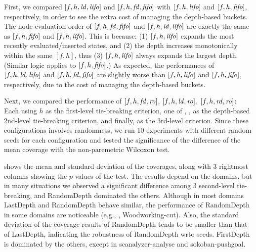 First, we compared $[f,h,\mbox{\textit{ld}},\mbox{\textit{lifo}}]$ and $[f,h,\mbox{\textit{fd}},\mbox{\textit{fifo}}]$
with $[f,h,\mbox{\textit{lifo}}]$ and $[f,h,\mbox{\textit{fifo}}]$, respectively, in order to see
the extra cost of managing the depth-based buckets.
The node evaluation order of $[f,h,\mbox{\textit{fd}},\mbox{\textit{fifo}}]$ and $[f,h,\mbox{\textit{ld}},\mbox{\textit{lifo}}]$
are exactly the same as $[f,h,\mbox{\textit{fifo}}]$ and $[f,h,\mbox{\textit{lifo}}]$.
This is because:
(1) $[f,h,\mbox{\textit{lifo}}]$ expands the most recently evaluated/inserted
states, and (2) the depth increases monotonically within the same $[f,h]$,
thus (3) $[f,h,\mbox{\textit{lifo}}]$ always expands the largest depth. (Similar logic
applies to $[f,h,\mbox{\textit{fifo}}]$.)
% 
As expected, the performances of $[f,h,\mbox{\textit{ld}},\mbox{\textit{lifo}}]$ and
$[f,h,\mbox{\textit{fd}},\mbox{\textit{fifo}}]$ are slightly worse than $[f,h,\mbox{\textit{lifo}}]$ and
$[f,h,\mbox{\textit{fifo}}]$, respectively, due to the cost of managing the depth-based buckets.

Next, we compared the performance of
$[f,h,\mbox{\textit{fd}},\mbox{\textit{ro}}]$, $[f,h,\mbox{\textit{ld}},\mbox{\textit{ro}}]$, $[f,h,\mbox{\textit{rd}},\mbox{\textit{ro}}]$: Each using
$h$ as the first-level tie-breaking criterion, one of \fd, \ld, \rd as
the depth-based 2nd-level tie-breaking criterion, and finally,
\ro as the 3rd-level criterion.
Since these configurations involves randomness, we run 10
experiments with different random seeds for each configuration and
tested the significance of the difference of the mean coverage with 
the non-paremetric Wilcoxon test.   %

 shows the mean and standard deviation of the coverages,
along with 3 rightmost columns showing the $p$ values of the
test. The results depend on the domains, but in many situations we
observed a significant difference among 3 second-level tie-breaking, and
RandomDepth dominated the others. Although in most domains LastDepth and
RandomDepth behave similar, the performance of RandomDepth in some
domains are noticeable (e.g., , Woodworking-cut). Also, the
standard deviation of the coverage results of RandomDepth tends to be smaller
than that of LastDepth, indicating the robustness of RandomDepth wrto seeds.
FirstDepth is dominated by the others, except in scanalyzer-analyse
and sokoban-pushgoal.


